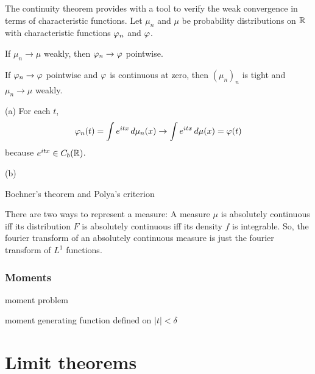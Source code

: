 \documentclass{../note}
\begin{document}
\begin{prb}
The continuity theorem provides with a tool to verify the weak convergence in terms of characteristic functions.
Let $\mu_n$ and $\mu$ be probability distributions on $\mathbb{R}$ with characteristic functions $\varphi_n$ and $\varphi$.
\begin{parts}
\item If $\mu_n\to\mu$ weakly, then $\varphi_n\to\varphi$ pointwise.
\item If $\varphi_n\to\varphi$ pointwise and $\varphi$ is continuous at zero, then $(\mu_n)_n$ is tight and $\mu_n\to\mu$ weakly.
\end{parts}
\end{prb}
\begin{pf}
(a)
For each $t$,
\[\varphi_n(t)=\int e^{itx}\,d\mu_n(x)\to\int e^{itx}\,d\mu(x)=\varphi(t)\]
because $e^{itx}\in C_b(\mathbb{R})$.

(b)


\end{pf}

\begin{prb}
Bochner's theorem and Polya's criterion
\end{prb}


There are two ways to represent a measure:
A measure $\mu$ is absolutely continuous iff its distribution $F$ is absolutely continuous iff its density $f$ is integrable.
So, the fourier transform of an absolutely continuous measure is just the fourier transform of $L^1$ functions.



\section{Moments}

moment problem

moment generating function defined on $|t|<\delta$



















\part{Limit theorems}
\end{document}
